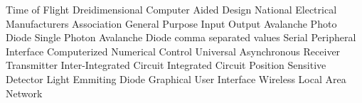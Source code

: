 
	{Time of Flight}
	{Dreidimensional}
	{Computer Aided Design}
	{National Electrical Manufacturers Association}
	{General Purpose Input Output}
	{Avalanche Photo Diode}
	{Single Photon Avalanche Diode}
	{comma separated values}
	{Serial Peripheral Interface}
	{Computerized Numerical Control}	
	{Universal Asynchronous Receiver Transmitter}
	{Inter-Integrated Circuit}
	{Integrated Circuit}
	{Position Sensitive Detector}
	{Light Emmiting Diode}
	{Graphical User Interface}
	{Wireless Local Area Network}